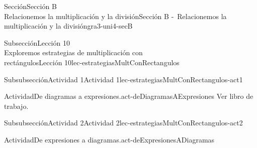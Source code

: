\begin{sectionptx}{Sección}{{\Large Sección B\\}Relacionemos la multiplicación y la división}{}{Sección B -~Relacionemos la multiplicación y la división}{}{}{gra3-uni4-secB}
\begin{subsectionptx}{Subsección}{{\normalsize Lección 10\\[-0.05cm]}Exploremos estrategias de multiplicación con\\rectángulos}{}{Lección 10}{}{}{lec-estrategiasMultConRectangulos}
\begin{subsubsectionptx}{Subsubsección}{Actividad 1}{}{Actividad 1}{}{}{lec-estrategiasMultConRectangulos-act1}
\begin{activity}{Actividad}{De diagramas a expresiones.}{act-deDiagramasAExpresiones}
Ver libro de trabajo.
\end{activity}%
\end{subsubsectionptx}
%
%
\typeout{************************************************}
\typeout{************************************************}
%
\begin{subsubsectionptx}{Subsubsección}{Actividad 2}{}{Actividad 2}{}{}{lec-estrategiasMultConRectangulos-act2}
\begin{activity}{Actividad}{De expresiones a diagramas.}{act-deExpresionesADiagramas}%

\end{activity}
\end{subsubsectionptx}
\end{subsectionptx}
\end{sectionptx}
